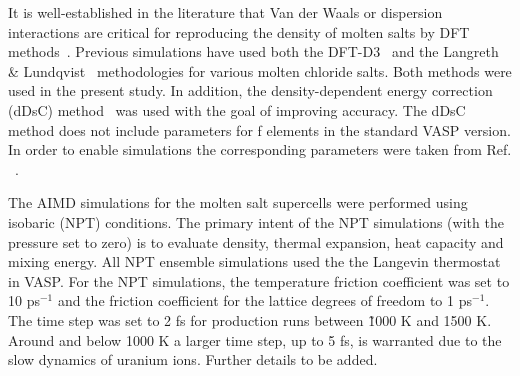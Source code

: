 \documentclass[preprint,3p,10pt,twocolumn,number,sort&compress]{elsarticle}
\begin{document}
It is well-established in the literature that Van der Waals or dispersion interactions are critical for reproducing the density of molten salts by DFT methods~\cite{Li,Nam2014,Nam2015}. Previous simulations have used both the DFT-D3~\cite{Li,Grimme} and the Langreth \& Lundqvist~\cite{Nam2015,Dion,Klimes} methodologies for various molten chloride salts. Both methods were used in the present study. %
In addition, the density-dependent energy correction (dDsC) method~\cite{Steinmann2011,Steinmann2} was used with the goal of improving accuracy. The dDsC method does not include parameters for f elements in the standard VASP version. In order to enable simulations the corresponding parameters were taken from Ref. ~\cite{Kim}. 

The AIMD simulations for the molten salt supercells were performed using isobaric (NPT) conditions. The primary intent of the NPT simulations (with the pressure set to zero) is to evaluate density, thermal expansion, heat capacity and mixing energy. All NPT ensemble simulations used the the Langevin thermostat in VASP. 
For the NPT simulations, the temperature friction coefficient was set to 10 ps$^{-1}$ and the friction coefficient for the lattice degrees of freedom to 1 ps$^{-1}$. The time step was set to 2 fs for production runs between \~1000 K and 1500 K. Around and below 1000 K a larger time step, up to 5 fs, is warranted due to the slow dynamics of uranium ions. {\color{red}Further details to be added.} %
\end{document}
